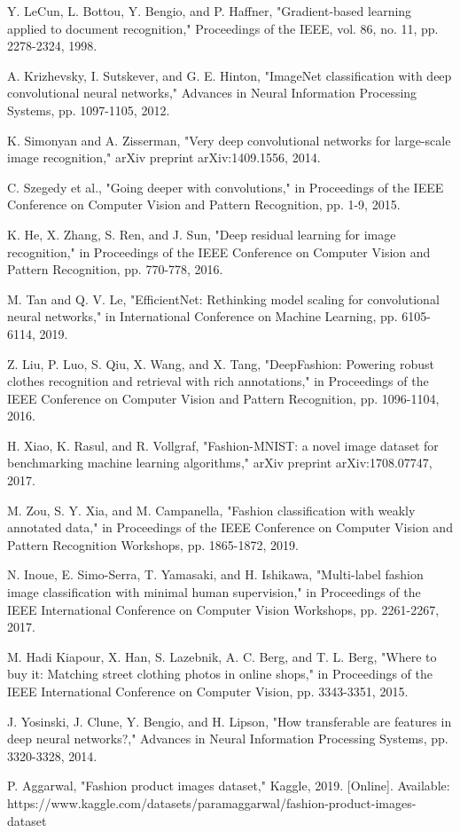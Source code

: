 \documentclass[10pt,journal,compsoc]{IEEEtran}
\begin{document}
\begin{thebibliography}{00}
 Y. LeCun, L. Bottou, Y. Bengio, and P. Haffner, "Gradient-based learning applied to document recognition," Proceedings of the IEEE, vol. 86, no. 11, pp. 2278-2324, 1998.

 A. Krizhevsky, I. Sutskever, and G. E. Hinton, "ImageNet classification with deep convolutional neural networks," Advances in Neural Information Processing Systems, pp. 1097-1105, 2012.

 K. Simonyan and A. Zisserman, "Very deep convolutional networks for large-scale image recognition," arXiv preprint arXiv:1409.1556, 2014.

 C. Szegedy et al., "Going deeper with convolutions," in Proceedings of the IEEE Conference on Computer Vision and Pattern Recognition, pp. 1-9, 2015.

 K. He, X. Zhang, S. Ren, and J. Sun, "Deep residual learning for image recognition," in Proceedings of the IEEE Conference on Computer Vision and Pattern Recognition, pp. 770-778, 2016.

 M. Tan and Q. V. Le, "EfficientNet: Rethinking model scaling for convolutional neural networks," in International Conference on Machine Learning, pp. 6105-6114, 2019.

 Z. Liu, P. Luo, S. Qiu, X. Wang, and X. Tang, "DeepFashion: Powering robust clothes recognition and retrieval with rich annotations," in Proceedings of the IEEE Conference on Computer Vision and Pattern Recognition, pp. 1096-1104, 2016.

 H. Xiao, K. Rasul, and R. Vollgraf, "Fashion-MNIST: a novel image dataset for benchmarking machine learning algorithms," arXiv preprint arXiv:1708.07747, 2017.

 M. Zou, S. Y. Xia, and M. Campanella, "Fashion classification with weakly annotated data," in Proceedings of the IEEE Conference on Computer Vision and Pattern Recognition Workshops, pp. 1865-1872, 2019.

 N. Inoue, E. Simo-Serra, T. Yamasaki, and H. Ishikawa, "Multi-label fashion image classification with minimal human supervision," in Proceedings of the IEEE International Conference on Computer Vision Workshops, pp. 2261-2267, 2017.

 M. Hadi Kiapour, X. Han, S. Lazebnik, A. C. Berg, and T. L. Berg, "Where to buy it: Matching street clothing photos in online shops," in Proceedings of the IEEE International Conference on Computer Vision, pp. 3343-3351, 2015.

 J. Yosinski, J. Clune, Y. Bengio, and H. Lipson, "How transferable are features in deep neural networks?," Advances in Neural Information Processing Systems, pp. 3320-3328, 2014.

 P. Aggarwal, "Fashion product images dataset," Kaggle, 2019. [Online]. Available: https://www.kaggle.com/datasets/paramaggarwal/fashion-product-images-dataset
\end{thebibliography}
\end{document}
